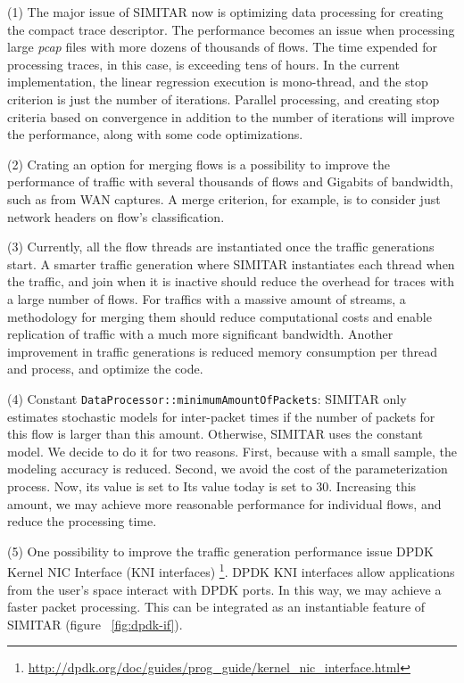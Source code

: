 (1) The major issue of SIMITAR now is optimizing data processing for creating the compact trace descriptor. The performance becomes an issue when processing large \textit{pcap} files with more dozens of thousands of flows. The time expended for processing traces, in this case, is exceeding tens of hours. In the current implementation, the linear regression execution is mono-thread, and the stop criterion is just the number of iterations. Parallel processing, and creating stop criteria based on convergence in addition to the number of iterations will improve the performance, along with some code optimizations.

(2) Crating an option for merging flows is a possibility to improve the performance of traffic with several thousands of flows and Gigabits of bandwidth, such as from WAN captures. A merge criterion, for example, is to consider just network headers on flow's classification.


(3) Currently, all the flow threads are instantiated once the traffic generations start. A smarter traffic generation where SIMITAR instantiates each thread when the traffic, and join when it is inactive should reduce the overhead for traces with a large number of flows. For traffics with a massive amount of streams, a methodology for merging them should reduce computational costs and enable replication of traffic with a much more significant bandwidth. Another improvement in traffic generations is reduced memory consumption per thread and process, and optimize the code.


(4) Constant \texttt{DataProcessor::minimumAmountOfPackets}: SIMITAR only estimates stochastic models for inter-packet times if the number of packets for this flow is larger than this amount. Otherwise, SIMITAR uses the constant model. We decide to do it for two reasons. First, because with a small sample, the modeling accuracy is reduced. Second, we avoid the cost of the parameterization process. Now, its value is set to Its value today is set to 30. Increasing this amount, we may achieve more reasonable performance for individual flows, and reduce the processing time. 


(5) One possibility to improve the traffic generation performance issue DPDK Kernel NIC Interface  (KNI interfaces) \footnote{\href{http://dpdk.org/doc/guides/prog_guide/kernel_nic_interface.html}{http://dpdk.org/doc/guides/prog\_guide/kernel\_nic\_interface.html}}. DPDK KNI interfaces allow applications from the user's space interact with DPDK ports. In this way, we may achieve a faster packet processing. This can be integrated as an instantiable feature of SIMITAR (figure ~\ref{fig:dpdk-if}).


